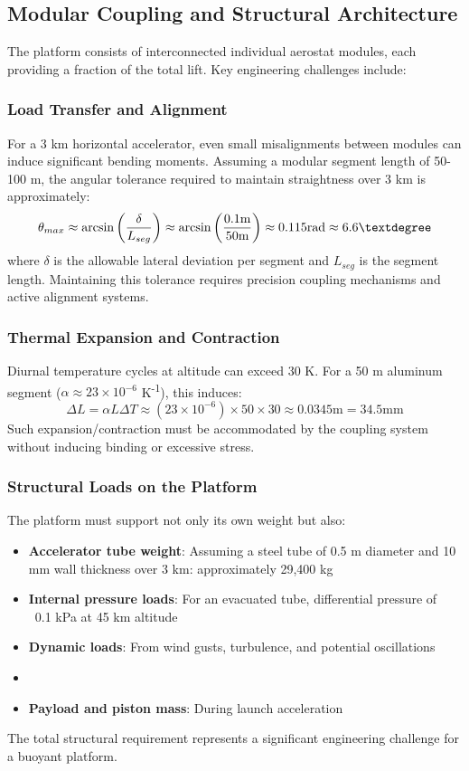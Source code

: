\documentclass[12pt]{article}
\begin{document}
\subsection{Modular Coupling and Structural Architecture}
The platform consists of interconnected individual aerostat modules, each providing a fraction of the total lift. Key engineering challenges include:

\subsubsection{Load Transfer and Alignment}
For a 3 km horizontal accelerator, even small misalignments between modules can induce significant bending moments. Assuming a modular segment length of 50-100 m, the angular tolerance required to maintain straightness over 3 km is approximately:
\begin{equation}
\theta_{max} \approx \arcsin\left(\frac{\delta}{L_{seg}}\right) \approx \arcsin\left(\frac{0.1  \text{m}}{50  \text{m}}\right) \approx 0.115  \text{rad} \approx 6.6\textdegree
\end{equation}
where $\delta$ is the allowable lateral deviation per segment and $L_{seg}$ is the segment length. Maintaining this tolerance requires precision coupling mechanisms and active alignment systems.

\subsubsection{Thermal Expansion and Contraction}
Diurnal temperature cycles at altitude can exceed 30 K. For a 50 m aluminum segment ($\alpha \approx 23 \times 10^{-6}$ K\textsuperscript{-1}), this induces:
\begin{equation}
\Delta L = \alpha L \Delta T \approx (23 \times 10^{-6}) \times 50 \times 30 \approx 0.0345  \text{m} = 34.5  \text{mm}
\end{equation}
Such expansion/contraction must be accommodated by the coupling system without inducing binding or excessive stress.

\subsubsection{Structural Loads on the Platform}
The platform must support not only its own weight but also:
\begin{itemize}
    \item \textbf{Accelerator tube weight}: Assuming a steel tube of 0.5 m diameter and 10 mm wall thickness over 3 km: approximately 29,400 kg
    \item \textbf{Internal pressure loads}: For an evacuated tube, differential pressure of ~0.1 kPa at 45 km altitude
    \item \textbf{Dynamic loads}: From wind gusts, turbulence, and potential oscillations
    \item \item \textbf{Payload and piston mass}: During launch acceleration
\end{itemize}
The total structural requirement represents a significant engineering challenge for a buoyant platform.
\end{document}
